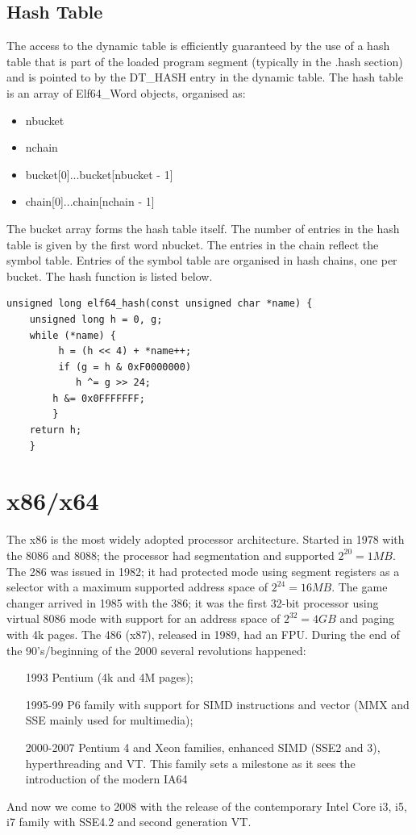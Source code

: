 \subsection{Hash Table} 
The access to the dynamic table is efficiently guaranteed by the use of a hash table that is part of the loaded program segment (typically in the {\ttfamily .hash} section) and is pointed to by the {\ttfamily DT\_HASH} entry in the dynamic table. The hash table is an array of {\ttfamily Elf64\_Word} objects, organised as:
\begin{itemize}
    \item {\ttfamily nbucket}
    \item {\ttfamily nchain}
    \item {\ttfamily bucket[0]...bucket[nbucket - 1]}
    \item {\ttfamily chain[0]...chain[nchain - 1]}
\end{itemize}
The {\ttfamily bucket} array forms the hash table itself. The number of entries in the hash table is given by the first word {\ttfamily nbucket}. The entries in the {\ttfamily chain} reflect the symbol table. Entries of the symbol table are organised in hash chains, one per bucket. The hash function is listed below.
\begin{lstlisting}[style=ansic, caption={Program Header}, label=hashtab]
unsigned long elf64_hash(const unsigned char *name) {
    unsigned long h = 0, g;
    while (*name) {
         h = (h << 4) + *name++;
         if (g = h & 0xF0000000)
            h ^= g >> 24;
        h &= 0x0FFFFFFF; 
        }
    return h;
    } 
\end{lstlisting}
\section{x86/x64}
The x86 is the most widely adopted processor architecture.  Started in 1978 with the 8086 and 8088; the processor had segmentation and supported $2^{20} = 1MB$.  The 286 was issued in 1982; it had protected mode using segment registers as a selector with a maximum supported address space of $2^{24} = 16MB$. The game changer arrived in 1985 with the 386; it was the first 32-bit processor using virtual 8086 mode with support for an address space of $2^{32} = 4GB$ and paging with 4k pages. The 486 (x87), released in 1989, had an FPU. During the end of the 90's/beginning of the 2000 several revolutions happened: \begin{itemize} \item[1993] Pentium (4k and 4M pages); \item[1995-99] P6 family with support for SIMD instructions and vector (MMX and SSE mainly used for multimedia); \item[2000-2007] Pentium 4 and Xeon families, enhanced SIMD (SSE2 and 3), hyperthreading and VT. This family sets a milestone as it sees the introduction of the modern IA64 \end{itemize} And now we come to 2008 with the release of the contemporary Intel Core i3, i5, i7 family with SSE4.2 and second generation VT.
